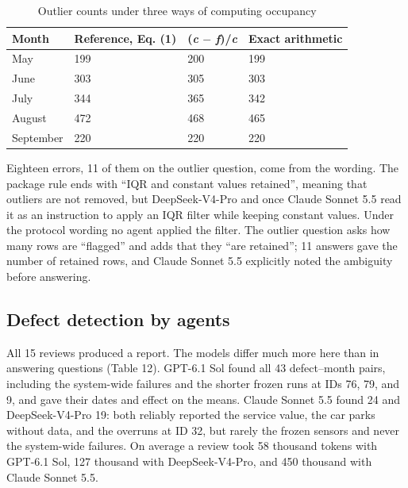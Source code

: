 \documentclass[default]{subfiles}
\begin{document}
{\begin{table}[htbp]
  \caption{Outlier counts under three ways of computing occupancy}
  \label{tab:11}
  \centering\small
  \begin{tabular}{p{}p{}p{}p{}}
    \hline
    \textbf{Month} & \textbf{Reference, Eq. (1)} & \textbf{(\emph{c} $-$ \emph{f})/\emph{c}} & \textbf{Exact arithmetic} \\ \hline
    May & 199 & 200 & 199 \\
    June & 303 & 305 & 303 \\
    July & 344 & 365 & 342 \\
    August & 472 & 468 & 465 \\
    September & 220 & 220 & 220 \\
    \hline
  \end{tabular}
\end{table}

Eighteen errors, 11 of them on the outlier question, come from the wording. The package rule ends with ``IQR and constant values retained'', meaning that outliers are not removed, but DeepSeek-V4-Pro and once Claude Sonnet 5.5 read it as an instruction to apply an IQR filter while keeping constant values. Under the protocol wording no agent applied the filter. The outlier question asks how many rows are ``flagged'' and adds that they ``are retained''; 11 answers gave the number of retained rows, and Claude Sonnet 5.5 explicitly noted the ambiguity before answering.

\subsection{Defect detection by agents}

All 15 reviews produced a report. The models differ much more here than in answering questions (Table 12). GPT-6.1 Sol found all 43 defect--month pairs, including the system-wide failures and the shorter frozen runs at IDs 76, 79, and 9, and gave their dates and effect on the means. Claude Sonnet 5.5 found 24 and DeepSeek-V4-Pro 19: both reliably reported the service value, the car parks without data, and the overruns at ID 32, but rarely the frozen sensors and never the system-wide failures. On average a review took 58 thousand tokens with GPT-6.1 Sol, 127 thousand with DeepSeek-V4-Pro, and 450 thousand with Claude Sonnet 5.5.

}
\end{document}
